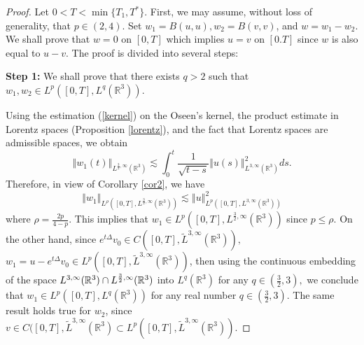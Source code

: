 \documentclass[10pt,a4paper]{amsart}
\begin{document}
\begin{proof}
Let $0<T<\min{\{T_1,T^\ast\}}.$ First, we may assume, without loss of generality, that
$p\in(2,4)$. Set $w_{1}=B(u,u),w_{2}=B(v,v)$, and $w=w_{1}-w_{2}.$ We shall
prove that $w=0$ on $[0,T]$ which implies $u=v$ on $[0.T]$ since $w$ is also equal to   $u-v$. The proof is divided  into several steps:
\par\noindent\textbf{Step 1:} We shall prove that there exists $q>2$
such that $w_{1},w_{2}\in L^{p}([0,T],L^{q}(\mathbb {R}^{3})).$
\par\noindent Using the estimation (\ref{kernel}) on the Oseen's kernel, the product estimate in Lorentz spaces (Proposition \ref{lorentz}), and the fact that Lorentz spaces are admissible spaces,  we obtain
\[
\left\Vert w_{1}(t)\right\Vert _{L^{\frac{3}{2},\infty }(\mathbb{R}%
^{3})}\lesssim \int_{0}^{t}\frac{1}{\sqrt{t-s}}\left\Vert u(s)\right\Vert
_{L^{3,\infty }(\mathbb{R}^{3})}^{2}ds.
\]%
Therefore, in view of  Corollary \ref{cor2}, we have
\[
\left\Vert w_{1}\right\Vert _{L^{\rho }([0,T],L^{\frac{3}{2},\infty }(%
\mathbb{R}^{3}))}\lesssim \left\Vert u\right\Vert _{L^{p}([0,T],L^{3,\infty
}(\mathbb{R}^{3}))}^{2}
\]%
where $\rho =\frac{2p}{4-p}.$ This implies that $w_1\in L^{p }([0,T],L^{\frac{3}{2},\infty }( \mathbb{R}^{3}))$ since $p\leq \rho$. On the other hand, since $%
e^{t\Delta }v_{0}\in C([0,T],\tilde{L}^{3,\infty }(\mathbb{R}^{3})),$ $%
w_{1}=u-e^{t\Delta }v_{0}\in L^{p}([0,T],\tilde{L}^{3,\infty }(\mathbb{R}%
^{3}))$, then using the continuous embedding of the space  $L^{3,\infty }(\mathbb{R}^{3})\cap L^{%
\frac{3}{2},\infty }(\mathbb{R}^{3})$ into $
L^{q}(\mathbb{R}^{3})$ for any $q\in (\frac{3}{2},3),$  we conclude that $%
w_{1}\in L^{p}([0,T],L^{q}(\mathbb{R}^{3}))$ for any real number $q\in (\frac{3}{2},3).$ The same result
holds true for $w_{2}$, since $v\in C([0,T],\tilde{L}^{3,\infty }(\mathbb{R}%
^{3})\subset L^{p}([0,T],\tilde{L}^{3,\infty }(\mathbb{R}^{3})).$


\end{proof}
\end{document}
